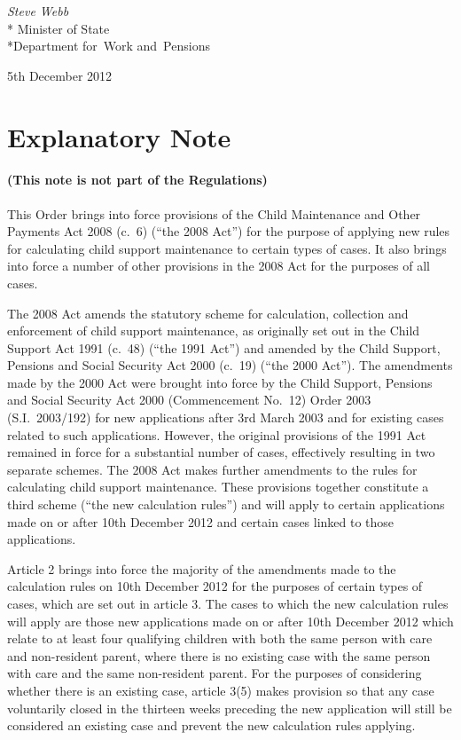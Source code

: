 \documentclass[12pt,a4paper]{article}
\begin{document}
{\raggedleft
\emph{Steve Webb}\\*
Minister
of State\\*Department 
for~Work and~Pensions

}

5th December 2012

\small

\part{Explanatory Note}

\renewcommand\parthead{— Explanatory Note}

\subsection*{(This note is not part of the Regulations)}

This Order brings into force provisions of the Child Maintenance and Other Payments Act 2008 (c.~6) (“the 2008 Act”) for the purpose of applying new rules for calculating child support maintenance to certain types of cases. It also brings into force a number of other provisions in the 2008 Act for the purposes of all cases.

The 2008 Act amends the statutory scheme for calculation, collection and enforcement of child support maintenance, as originally set out in the Child Support Act 1991 (c.~48) (“the 1991 Act”) and amended by the Child Support, Pensions and Social Security Act 2000 (c.~19) (“the 2000 Act”). The amendments made by the 2000 Act were brought into force by the Child Support, Pensions and Social Security Act 2000 (Commencement No.~12) Order 2003 (S.I.~2003/192) for new applications after 3rd March 2003 and for existing cases related to such applications. However, the original provisions of the 1991 Act remained in force for a substantial number of cases, effectively resulting in two separate schemes. The 2008 Act makes further amendments to the rules for calculating child support maintenance. These provisions together constitute a third scheme (“the new calculation rules”) and will apply to certain applications made on or after 10th December 2012 and certain cases linked to those applications.

Article 2 brings into force the majority of the amendments made to the calculation rules on 10th December 2012 for the purposes of certain types of cases, which are set out in article 3. The cases to which the new calculation rules will apply are those new applications made on or after 10th December 2012 which relate to at least four qualifying children with both the same person with care and non-resident parent, where there is no existing case with the same person with care and the same non-resident parent. For the purposes of considering whether there is an existing case, article 3(5) makes provision so that any case voluntarily closed in the thirteen weeks preceding the new application will still be considered an existing case and prevent the new calculation rules applying.
\end{document}
